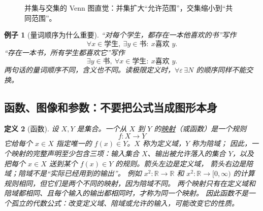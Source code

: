 \documentclass[UTF8,fontset=none,a4paper,11pt]{ctexart}
\theoremstyle{foundation-definition}
\newtheorem{definition}{定义}[section]
\theoremstyle{foundation-theorem}
\theoremstyle{foundation-proposition}
\theoremstyle{foundation-example}
\newtheorem{example}[definition]{例子}
\theoremstyle{foundation-remark}
\theoremstyle{foundation-theorem}
\newcommand{\term}[2]{\hyperref[#1]{#2}}
\begin{document}
\begin{figure}[htbp]
\centering
{}
\caption{并集与交集的 Venn 图直觉：并集扩大“允许范围”，交集缩小到“共同范围”。}
\label{fig:set-operations-venn}
\end{figure}

\begin{example}[量词顺序为什么重要]
“对每个学生，都存在一本他喜欢的书”写作
\[
\forall x\in\text{学生},\ \exists y\in\text{书}:\ x\text{喜欢 }y.
\]
“存在一本书，所有学生都喜欢它”写作
\[
\exists y\in\text{书},\ \forall x\in\text{学生}:\ x\text{喜欢 }y.
\]
两句话的量词顺序不同，含义也不同。读极限定义时，\(\forall\varepsilon\,\exists N\) 的顺序同样不能交换。
\end{example}

\subsection{函数、图像和参数：不要把公式当成图形本身}

\begin{definition}[函数]\label{def:set-function}
设 \(X,Y\) 是集合。一个从 \(X\) 到 \(Y\) 的\term{def:set-function}{映射}（或函数）是一个规则
\[
f:X\longrightarrow Y
\]
它给每个 \(x\in X\) 指定唯一的 \(f(x)\in Y\)。\(X\) 称为定义域，\(Y\) 称为陪域；
因此，一个映射的完整声明至少包含三项：输入集合 \(X\)、输出被允许落入的集合
\(Y\)，以及把每个 \(x\in X\) 送到某个 \(f(x)\in Y\) 的规则。箭头左边是定义域，
箭头右边是陪域；陪域不是“实际已经用到的输出”。
例如 \(x^2:\mathbb R\to\mathbb R\) 和
\(x^2:\mathbb R\to[0,\infty)\) 的计算规则相同，但它们是两个不同的映射，因为陪域不同。
两个映射只有在定义域和陪域都相同、且每个输入的输出都相同时，才称为同一个映射。
因此函数不是一个孤立的代数公式：改变定义域、陪域或允许的输入，可能改变它的性质。
\end{definition}
\end{document}
